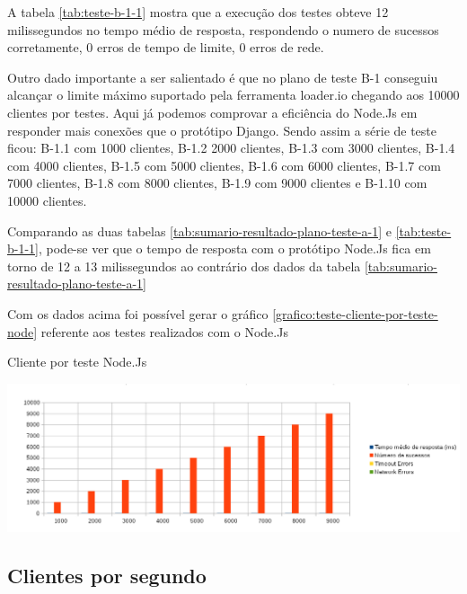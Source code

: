   A tabela \ref{tab:teste-b-1-1} mostra que a execução dos testes obteve 12 milissegundos no tempo médio de resposta,
  respondendo o numero de sucessos corretamente, 0 erros de tempo de limite, 0 erros de rede.
  
  Outro dado importante a ser salientado é que no plano de teste B-1 conseguiu alcançar o limite máximo suportado pela ferramenta
  loader.io chegando aos 10000 clientes por testes. Aqui já podemos comprovar a eficiência do Node.Js em responder mais conexões que
  o protótipo Django. Sendo assim a série de teste ficou: B-1.1 com 1000 clientes, B-1.2 2000 clientes, 
  B-1.3 com 3000 clientes, B-1.4 com 4000 clientes, B-1.5 com 5000 clientes, B-1.6 com 6000 clientes, B-1.7 com 7000 clientes,
  B-1.8 com 8000 clientes, B-1.9 com 9000 clientes e B-1.10 com 10000 clientes.
  
  Comparando as duas tabelas \ref{tab:sumario-resultado-plano-teste-a-1} e \ref{tab:teste-b-1-1}, pode-se ver que 
  o tempo de resposta com o protótipo Node.Js fica em torno de 12 a 13 milissegundos ao contrário dos dados da tabela \ref{tab:sumario-resultado-plano-teste-a-1}
  
  Com os dados acima foi possível gerar o gráfico \ref{grafico:teste-cliente-por-teste-node} referente aos testes 
  realizados com o Node.Js

  \begin{grafico}[H]
    \setlength{\abovecaptionskip}{5pt}
    \setlength{\belowcaptionskip}{0pt}
    \label{grafico:teste-cliente-por-teste-node}
    \caption[Cliente por teste Node.Js]
	    {Cliente por teste Node.Js}
    \centering
    \includegraphics[width=.80\textwidth]{imagem/graficos/grafico_node_plano_de_teste_1.png}
    \captionsetup[grafico]{justification=centering}
  \end{grafico}
   
\subsection{Clientes por segundo}  


